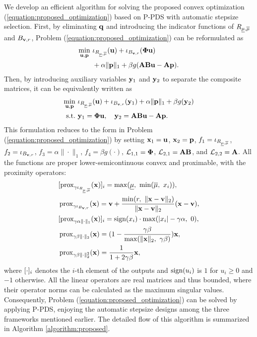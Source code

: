 We develop an efficient algorithm for solving the proposed convex optimization (\ref{equation:proposed_optimization}) based on P-PDS with automatic stepsize selection.
First, by eliminating $\mathbf{q}$ and introducing the indicator functions of $R_{\underline{\mu}, \overline{\mu}}$ and $B_{\mathbf{v}, r}$, Problem (\ref{equation:proposed_optimization}) can be reformulated as 
\begin{align}
    \begin{split}
        \min_{\mathbf{u}, \mathbf{p}} \ &\iota_{R_{\underline{\mu}, \overline{\mu}}}(\mathbf{u}) + \iota_{B_{\mathbf{v}, r}}(\mathbf{\Phi} \mathbf{u}) \\
                        &+ \alpha \|\mathbf{p}\|_{1} + \beta g(\mathbf{A} \mathbf{B} \mathbf{u} - \mathbf{A} \mathbf{p}).
    \end{split}
\end{align}
Then, by introducing auxiliary variables $\mathbf{y}_1$ and $\mathbf{y}_2$ to separate the composite matrices, it can be equivalently written as
\begin{align}
    \begin{split}
        \min_{\mathbf{u}, \mathbf{p}} \ &\iota_{R_{\underline{\mu}, \overline{\mu}}}(\mathbf{u}) + \iota_{B_{\mathbf{v}, r}}(\mathbf{y}_1) + \alpha \|\mathbf{p}\|_{1} + \beta g(\mathbf{y}_2) \\
        \text{s.t.} \ &\mathbf{y}_1 = \mathbf{\Phi} \mathbf{u}, \quad \mathbf{y}_2 = \mathbf{A} \mathbf{B} \mathbf{u} - \mathbf{A} \mathbf{p}.
    \end{split}
\end{align}
This formulation reduces to the form in Problem (\ref{equation:proposed_optimization}) by setting $\mathbf{x}_1 = \mathbf{u}$, $\mathbf{x}_2 = \mathbf{p}$, $f_1 = \iota_{R_{\underline{\mu}, \overline{\mu}}}$, $f_2 = \iota_{B_{\mathbf{v}, r}}$, $f_3 = \alpha \|\cdot\|_{1}$, $f_4 = \beta g(\cdot)$, $\mathcal{L}_{1,1} = \mathbf{\Phi}$, $\mathcal{L}_{2,1} = \mathbf{A} \mathbf{B}$, and $\mathcal{L}_{2,2} = \mathbf{A}$.
All the functions are proper lower-semicontinuous convex and proximable, with the proximity operators:
\begin{align}
    &[\operatorname{prox}_{\gamma \iota_{R_{\underline{\mu}, \overline{\mu}}}} ({\mathbf{x}})]_{i} = \max ({\underline{\mu}}, \ {\min ({\overline{\mu}}, \ {x_i})}), \\
    &\operatorname{prox}_{\gamma \iota_{B_{\mathbf{v}, r}}} ({\mathbf{x}}) = \mathbf{v} + \frac{\min ({r}, \ {\lVert \mathbf{x} - \mathbf{v} \rVert_2})}{\lVert \mathbf{x} - \mathbf{v} \rVert_2} (\mathbf{x} - \mathbf{v}), \\
    &[\operatorname{prox}_{\gamma \alpha \lVert \cdot \rVert_1} ({\mathbf{x}})]_{i} = \operatorname{sign} (x_i) \cdot \max ({\lvert x_i \rvert - \gamma \alpha}, \ {0}), \\
    &\operatorname{prox}_{\gamma \beta \lVert \cdot \rVert_2} ({\mathbf{x}}) = (1 - \frac{\gamma \beta}{\max ({\lVert \mathbf{x} \rVert_2}, \ {\gamma \beta})}) \mathbf{x}, \\
    &\operatorname{prox}_{\gamma \beta \lVert \cdot \rVert_2^2} ({\mathbf{x}}) = \frac{1}{1 + 2 \gamma \beta} \mathbf{x},
\end{align} 
where $[\cdot]_{i}$ denotes the $i$-th element of the outputs and $\text{sign} (u_i)$ is $1$ for $u_i \ge 0$ and $-1$ otherwise.
All the linear operators are real matrices and thus bounded, where their operator norms can be calculated as the maximum singular values.
Consequently, Problem (\ref{equation:proposed_optimization}) can be solved by applying P-PDS, enjoying the automatic stepsize designs among the three frameworks mentioned earlier.
The detailed flow of this algorithm is summarized in Algorithm \ref{algorithm:proposed}.
